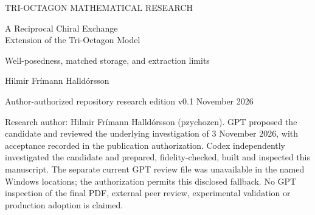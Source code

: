\documentclass[11pt,a4paper]{article}
\numberwithin{equation}{section}
\theoremstyle{remark}\newtheorem{remark}[theorem]{Remark}
\begin{document}
\hypersetup{pageanchor=false}
\begin{titlepage}
\vspace*{5mm}
{\small\color{MidnightBlue} TRI-OCTAGON MATHEMATICAL RESEARCH\par}
\vspace{8mm}
{\LARGE\bfseries\raggedright A Reciprocal Chiral Exchange\\ Extension of the Tri-Octagon Model\par}
\vspace{6mm}
{\large Well-posedness, matched storage, and extraction limits\par}
\vspace{7mm}
{\large Hilmir Fr\'imann Halld\'orsson\par}
\vspace{3mm}
{Author-authorized repository research edition v0.1 November 2026\par}
\vspace{5mm}
\begin{abstract}
We study one explicit candidate extension coupling the Tri-Octagon native state to its conditional periodic carrier and to a reversible two-port receiver. The existing raw chiral drive is retained, while a homogeneous reciprocal completion matches carrier work to changes in a positive trial native storage. A quadratic receiver storage has an equal and opposite carrier loading term. We prove global forward and backward exchange-time well-posedness in the natural energy space, with a separate regularity estimate for periodic $H^1$ preparations. Empty-carrier preparations exhibit nonzero short-time native supply and receiver gain; other prepared carrier states yield native credit. The exchange conserves the complex bilinear quantity $\sum_i\Omega_i^2$, imposing a restrictive bound on net extraction from coherent initial states and leaving aligned empty preparations dark. Explicit counterexamples prevent transfer of universal coherent-domain invariance to the coupled model. An ordered hybrid step retains the unchanged native map before exact exchange; its total storage increment is precisely the native baseline intensity increment, and zero coupling recovers the original native sampling. These are results about a mathematically verified candidate, not adoption into the accepted kernel or a derived physical energy law. Delayed native credit on the same solution after an empty launch, irreversible disposal and physical toroidal registration remain open.
\end{abstract}
\vfill
{\small Research author: Hilmir Fr\'imann Halld\'orsson (pzychozen).
GPT proposed the candidate and reviewed the underlying investigation of 3 November 2026, with acceptance recorded in the publication authorization.
Codex independently investigated the candidate and prepared, fidelity-checked, built and inspected this manuscript.
The separate current GPT review file was unavailable in the named Windows locations; the authorization permits this disclosed fallback.
No GPT inspection of the final PDF, external peer review, experimental validation or production adoption is claimed.}
\end{titlepage}
\setcounter{page}{2}\hypersetup{pageanchor=true}








\appendix


\end{document}
